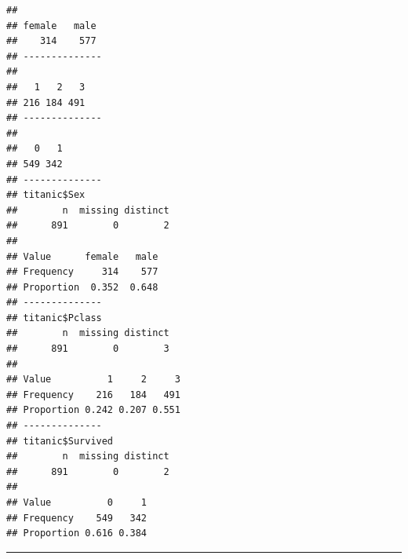 \documentclass[]{book}
\newenvironment{Shaded}{\begin{snugshade}}{\end{snugshade}}
\newcommand{\KeywordTok}[1]{\textcolor[rgb]{0.13,0.29,0.53}{\textbf{#1}}}
\newcommand{\CharTok}[1]{\textcolor[rgb]{0.31,0.60,0.02}{#1}}
\newcommand{\StringTok}[1]{\textcolor[rgb]{0.31,0.60,0.02}{#1}}
\newcommand{\CommentTok}[1]{\textcolor[rgb]{0.56,0.35,0.01}{\textit{#1}}}
\newcommand{\OperatorTok}[1]{\textcolor[rgb]{0.81,0.36,0.00}{\textbf{#1}}}
\newcommand{\NormalTok}[1]{#1}
\theoremstyle{definition}
\theoremstyle{definition}
\theoremstyle{definition}
\theoremstyle{remark}
\begin{document}
\begin{Shaded}
\end{Shaded}

\begin{verbatim}
## 
## female   male 
##    314    577 
## --------------
## 
##   1   2   3 
## 216 184 491 
## --------------
## 
##   0   1 
## 549 342 
## --------------
## titanic$Sex 
##        n  missing distinct 
##      891        0        2 
##                         
## Value      female   male
## Frequency     314    577
## Proportion  0.352  0.648
## --------------
## titanic$Pclass 
##        n  missing distinct 
##      891        0        3 
##                             
## Value          1     2     3
## Frequency    216   184   491
## Proportion 0.242 0.207 0.551
## --------------
## titanic$Survived 
##        n  missing distinct 
##      891        0        2 
##                       
## Value          0     1
## Frequency    549   342
## Proportion 0.616 0.384
\end{verbatim}

\begin{center}\rule{0.5\linewidth}{\linethickness}\end{center}
\end{document}
